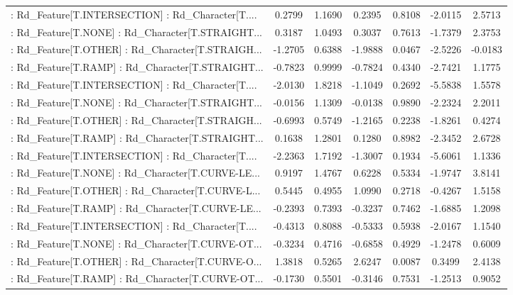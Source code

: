 \begin{longtable}{p{4cm}cccccc}
 : Rd\_Feature[T.INTERSECTION] : Rd\_Character[T.... &  0.2799 &    1.1690 &  0.2395 &       0.8108 & -2.0115 &  2.5713 \\
 : Rd\_Feature[T.NONE] : Rd\_Character[T.STRAIGHT... &  0.3187 &    1.0493 &  0.3037 &       0.7613 & -1.7379 &  2.3753 \\
 : Rd\_Feature[T.OTHER] : Rd\_Character[T.STRAIGH... & -1.2705 &    0.6388 & -1.9888 &       0.0467 & -2.5226 & -0.0183 \\
 : Rd\_Feature[T.RAMP] : Rd\_Character[T.STRAIGHT... & -0.7823 &    0.9999 & -0.7824 &       0.4340 & -2.7421 &  1.1775 \\
 : Rd\_Feature[T.INTERSECTION] : Rd\_Character[T.... & -2.0130 &    1.8218 & -1.1049 &       0.2692 & -5.5838 &  1.5578 \\
 : Rd\_Feature[T.NONE] : Rd\_Character[T.STRAIGHT... & -0.0156 &    1.1309 & -0.0138 &       0.9890 & -2.2324 &  2.2011 \\
 : Rd\_Feature[T.OTHER] : Rd\_Character[T.STRAIGH... & -0.6993 &    0.5749 & -1.2165 &       0.2238 & -1.8261 &  0.4274 \\
 : Rd\_Feature[T.RAMP] : Rd\_Character[T.STRAIGHT... &  0.1638 &    1.2801 &  0.1280 &       0.8982 & -2.3452 &  2.6728 \\
 : Rd\_Feature[T.INTERSECTION] : Rd\_Character[T.... & -2.2363 &    1.7192 & -1.3007 &       0.1934 & -5.6061 &  1.1336 \\
 : Rd\_Feature[T.NONE] : Rd\_Character[T.CURVE-LE... &  0.9197 &    1.4767 &  0.6228 &       0.5334 & -1.9747 &  3.8141 \\
 : Rd\_Feature[T.OTHER] : Rd\_Character[T.CURVE-L... &  0.5445 &    0.4955 &  1.0990 &       0.2718 & -0.4267 &  1.5158 \\
 : Rd\_Feature[T.RAMP] : Rd\_Character[T.CURVE-LE... & -0.2393 &    0.7393 & -0.3237 &       0.7462 & -1.6885 &  1.2098 \\
 : Rd\_Feature[T.INTERSECTION] : Rd\_Character[T.... & -0.4313 &    0.8088 & -0.5333 &       0.5938 & -2.0167 &  1.1540 \\
 : Rd\_Feature[T.NONE] : Rd\_Character[T.CURVE-OT... & -0.3234 &    0.4716 & -0.6858 &       0.4929 & -1.2478 &  0.6009 \\
 : Rd\_Feature[T.OTHER] : Rd\_Character[T.CURVE-O... &  1.3818 &    0.5265 &  2.6247 &       0.0087 &  0.3499 &  2.4138 \\
 : Rd\_Feature[T.RAMP] : Rd\_Character[T.CURVE-OT... & -0.1730 &    0.5501 & -0.3146 &       0.7531 & -1.2513 &  0.9052 \\

\end{longtable}
